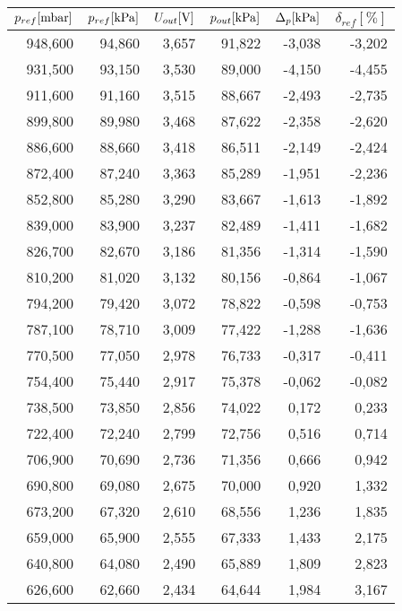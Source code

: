 \begin{tabular}{rrrrrr}
\toprule
$p_{{ref}} [\unit{{\milli\bar}}]$ & $p_{{ref}} [\unit{{\kilo\pascal}}]$ & $U_{{out}} [\unit{{\volt}}]$ & $p_{{out}} [\unit{{\kilo\pascal}}]$ & $\Delta_{{p}} [\unit{{\kilo\pascal}}]$ & $\delta_{{ref}} [\unit{{\percent}}]$ \\
\midrule
948,600 & 94,860 & 3,657 & 91,822 & -3,038 & -3,202 \\
931,500 & 93,150 & 3,530 & 89,000 & -4,150 & -4,455 \\
911,600 & 91,160 & 3,515 & 88,667 & -2,493 & -2,735 \\
899,800 & 89,980 & 3,468 & 87,622 & -2,358 & -2,620 \\
886,600 & 88,660 & 3,418 & 86,511 & -2,149 & -2,424 \\
872,400 & 87,240 & 3,363 & 85,289 & -1,951 & -2,236 \\
852,800 & 85,280 & 3,290 & 83,667 & -1,613 & -1,892 \\
839,000 & 83,900 & 3,237 & 82,489 & -1,411 & -1,682 \\
826,700 & 82,670 & 3,186 & 81,356 & -1,314 & -1,590 \\
810,200 & 81,020 & 3,132 & 80,156 & -0,864 & -1,067 \\
794,200 & 79,420 & 3,072 & 78,822 & -0,598 & -0,753 \\
787,100 & 78,710 & 3,009 & 77,422 & -1,288 & -1,636 \\
770,500 & 77,050 & 2,978 & 76,733 & -0,317 & -0,411 \\
754,400 & 75,440 & 2,917 & 75,378 & -0,062 & -0,082 \\
738,500 & 73,850 & 2,856 & 74,022 & 0,172 & 0,233 \\
722,400 & 72,240 & 2,799 & 72,756 & 0,516 & 0,714 \\
706,900 & 70,690 & 2,736 & 71,356 & 0,666 & 0,942 \\
690,800 & 69,080 & 2,675 & 70,000 & 0,920 & 1,332 \\
673,200 & 67,320 & 2,610 & 68,556 & 1,236 & 1,835 \\
659,000 & 65,900 & 2,555 & 67,333 & 1,433 & 2,175 \\
640,800 & 64,080 & 2,490 & 65,889 & 1,809 & 2,823 \\
626,600 & 62,660 & 2,434 & 64,644 & 1,984 & 3,167 \\
\bottomrule
\end{tabular}
